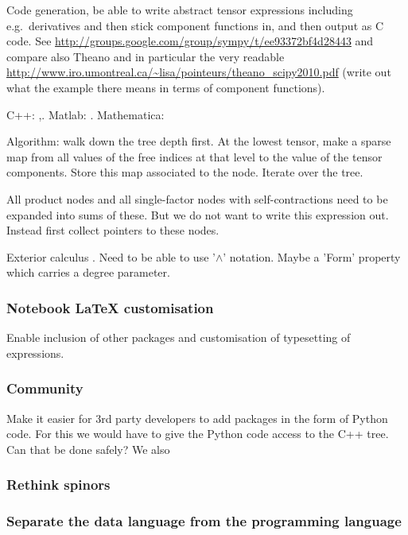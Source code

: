 \documentclass[11pt]{article}
\begin{document}
Code generation, be able to write abstract tensor expressions
including e.g.~derivatives and then stick component functions in, and
then output as C code. See
\url{http://groups.google.com/group/sympy/t/ee93372bf4d28443}
and compare also Theano and in particular the
very readable \url{http://www.iro.umontreal.ca/~lisa/pointeurs/theano_scipy2010.pdf}
(write out what the example there means in terms of component functions).

C++: \cite{ltensor},\cite{ftensor}.
Matlab: \cite{TTB_Software}.
Mathematica: \cite{kranc}

Algorithm: walk down the tree depth first. At the lowest tensor, make
a sparse map from all values of the free indices at that level to the
value of the tensor components. Store this map associated to the
node. Iterate over the tree.

All product nodes and all single-factor nodes with self-contractions
need to be expanded into sums of these. But we do not want to write
this expression out. Instead first collect pointers to these nodes.

Exterior calculus \cite{xTerior}. Need to be able to use '$\wedge$'
notation. Maybe a 'Form' property which carries a degree parameter.


\subsubsection{Notebook \LaTeX{} customisation}

Enable inclusion of other packages and customisation of typesetting of expressions.

\subsubsection{Community}

Make it easier for 3rd party developers to add packages in the form of
Python code. For this we would have to give the Python code access to
the C++ tree. Can that be done safely? We also 

\subsubsection{Rethink spinors}

\subsubsection{Separate the data language from the programming language}
\end{document}
